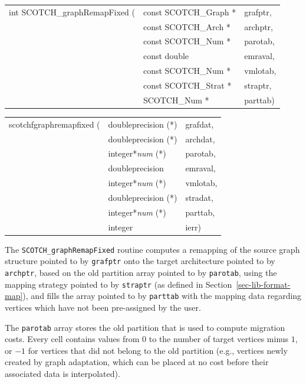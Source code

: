 \begin{itemize}
\progsyn

{\tt\begin{tabular}{l@{}ll}
int SCOTCH\_graphRemapFixed ( & const SCOTCH\_Graph * & grafptr, \\
                              & const SCOTCH\_Arch *  & archptr, \\
                              & const SCOTCH\_Num *   & parotab, \\
                              & const double          & emraval, \\
                              & const SCOTCH\_Num *   & vmlotab, \\
                              & const SCOTCH\_Strat * & straptr, \\
                              & SCOTCH\_Num *         & parttab)
\end{tabular}}

{\tt\begin{tabular}{l@{}ll}
scotchfgraphremapfixed ( & doubleprecision (*)   & grafdat, \\
                         & doubleprecision (*)   & archdat, \\
                         & integer*{\it num} (*) & parotab, \\
                         & doubleprecision       & emraval, \\
                         & integer*{\it num} (*) & vmlotab, \\
                         & doubleprecision (*)   & stradat, \\
                         & integer*{\it num} (*) & parttab, \\
                         & integer               & ierr)
\end{tabular}}

\progdes

The {\tt SCOTCH\_graphRemapFixed} routine computes a remapping of the
source graph structure pointed to by {\tt grafptr} onto the target
architecture pointed to by {\tt archptr}, based on the old partition
array pointed to by {\tt parotab}, using the mapping strategy pointed
to by {\tt straptr} (as defined in Section~\ref{sec-lib-format-map}),
and fills the array pointed to by {\tt parttab} with the mapping data
regarding vertices which have not been pre-assigned by the user.

The {\tt parotab} array stores the old partition that is used to
compute migration costs. Every cell contains values from $0$ to the
number of target vertices minus $1$, or $-1$ for vertices that did not
belong to the old partition (e.g., vertices newly created by graph
adaptation, which can be placed at no cost before their associated
data is interpolated).


\end{itemize}
